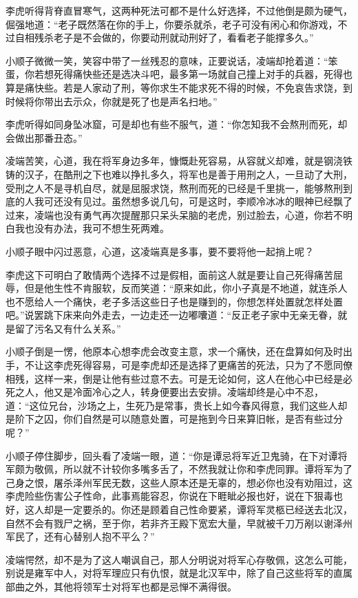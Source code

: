 李虎听得背脊直冒寒气，这两种死法可都不是什么好选择，不过他倒是颇为硬气，倔强地道：“老子既然落在你的手上，你要杀就杀，老子可没有闲心和你游戏，不过自相残杀老子是不会做的，你要动刑就动刑好了，看看老子能撑多久。”

小顺子微微一笑，笑容中带了一丝残忍的意味，正要说话，凌端却抢着道：“笨蛋，你若想死得痛快些还是选决斗吧，最多第一场就自己撞上对手的兵器，死得也算是痛快些。若是人家动了刑，等你求生不能求死不得的时候，不免哀告求饶，到时候将你带出去示众，你就是死了也是声名扫地。”

李虎听得如同身坠冰窟，可是却也有些不服气，道：“你怎知我不会熬刑而死，却会做出那番丑态。”

凌端苦笑，心道，我在将军身边多年，慷慨赴死容易，从容就义却难，就是钢浇铁铸的汉子，在酷刑之下也难以挣扎多久，将军也是善于用刑之人，一旦动了大刑，受刑之人不是寻机自尽，就是屈服求饶，熬刑而死的已经是千里挑一，能够熬刑到底的人我可还没有见过。虽然想多说几句，可是这时，李顺冷冰冰的眼神已经飘了过来，凌端也没有勇气再次提醒那只呆头呆脑的老虎，别过脸去，心道，你若不明白我也没有办法，我可不想生死两难。

小顺子眼中闪过恶意，心道，这凌端真是多事，要不要将他一起捎上呢？

李虎这下可明白了敢情两个选择不过是假相，面前这人就是要让自己死得痛苦屈辱，但是他生性不肯服软，反而笑道：“原来如此，你小子真是不地道，就连杀人也不愿给人一个痛快，老子多活这些日子也是赚到的，你想怎样处置就怎样处置吧。”说罢跳下床来向外走去，一边走还一边嘟囔道：“反正老子家中无亲无眷，就是留了污名又有什么关系。”

小顺子倒是一愣，他原本心想李虎会改变主意，求一个痛快，还在盘算如何及时出手，不让这李虎死得容易，可是李虎却还是选择了更痛苦的死法，只为了不愿同僚相残，这样一来，倒是让他有些过意不去。可是无论如何，这人在他心中已经是必死之人，他又是冷面冷心之人，转身便要出去安排。凌端却终是心中不忍，道：“这位兄台，沙场之上，生死乃是常事，贵长上如今春风得意，我们这些人却是阶下之囚，你们自然是可以随意处置，可是拖到今日来算旧帐，是否有些过分呢？”

小顺子停住脚步，回头看了凌端一眼，道：“你是谭忌将军近卫鬼骑，在下对谭将军颇为敬佩，所以就不计较你多嘴多舌了，不然我就让你和李虎同罪。谭将军为了己身之恨，屠杀泽州军民无数，这些人原本还是无辜的，想必你也没有劝阻过，这李虎险些伤害公子性命，此事焉能容忍，你说在下睚眦必报也好，说在下狠毒也好，这人却是一定要杀的。你还是顾着自己性命要紧，谭将军灵柩已经送去北汉，自然不会有戮尸之祸，至于你，若非齐王殿下宽宏大量，早就被千刀万剐以谢泽州军民了，还有心替别人抱不平么？”

凌端愕然，却不是为了这人嘲讽自己，那人分明说对将军心存敬佩，这怎么可能，别说是雍军中人，对将军理应只有仇恨，就是北汉军中，除了自己这些将军的直属部曲之外，其他将领军士对将军也都是忌惮不满得很。

